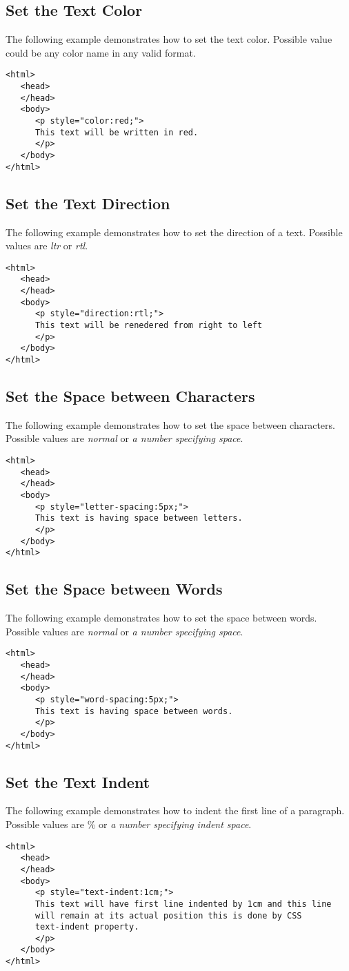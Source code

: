 \documentclass[a4paper,oneside]{book}
\numberwithin{equation}{chapter}
\begin{document}
\subsection{Set the Text Color}
The following example demonstrates how to set the text color. Possible value could be any color name in any valid format.
\begin{verbatim}
<html>
   <head>
   </head>
   <body>
      <p style="color:red;">
      This text will be written in red.
      </p>
   </body>
</html>
\end{verbatim}
\subsection{Set the Text Direction}
The following example demonstrates how to set the direction of a text. Possible values are \textit{ltr} or \textit{rtl}.
\begin{verbatim}
<html>
   <head>
   </head>
   <body>
      <p style="direction:rtl;">
      This text will be renedered from right to left
      </p>
   </body>
</html>
\end{verbatim}
\subsection{Set the Space between Characters}
The following example demonstrates how to set the space between characters. Possible values are \textit{normal} or \textit{a number specifying space}.
\begin{verbatim}
<html>
   <head>
   </head>
   <body>
      <p style="letter-spacing:5px;">
      This text is having space between letters.
      </p>
   </body>
</html>
\end{verbatim}
\subsection{Set the Space between Words}
The following example demonstrates how to set the space between words. Possible values are \textit{normal} or \textit{a number specifying space}.
\begin{verbatim}
<html>
   <head>
   </head>
   <body>
      <p style="word-spacing:5px;">
      This text is having space between words.
      </p>
   </body>
</html>
\end{verbatim}
\subsection{Set the Text Indent}
The following example demonstrates how to indent the first line of a paragraph. Possible values are \% or \textit{a number specifying indent space}.
\begin{verbatim}
<html>
   <head>
   </head>
   <body>
      <p style="text-indent:1cm;">
      This text will have first line indented by 1cm and this line
      will remain at its actual position this is done by CSS 
      text-indent property.
      </p>
   </body>
</html>
\end{verbatim}
\end{document}
